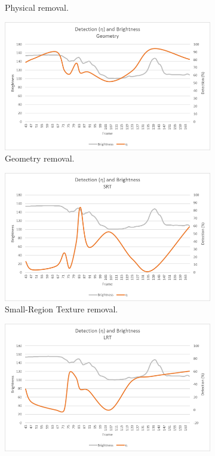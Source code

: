 \begin{figure}
\begin{subfigure}{.32\linewidth}
  \caption{Physical removal.}
\end{subfigure}
\hfill
\begin{subfigure}{.32\linewidth}
  \includegraphics[width=1\linewidth]{figures/selectinganalgorithm_geometry.jpg}
  \caption{Geometry removal.}
\end{subfigure}
\hfill
\begin{subfigure}{.32\linewidth}
  \includegraphics[width=1\linewidth]{figures/selectinganalgorithm_srt.jpg}
  \caption{Small-Region Texture removal.}
\end{subfigure}
\begin{subfigure}{.32\linewidth}
  \includegraphics[width=1\linewidth]{figures/selectinganalgorithm_lrt.jpg}

\end{subfigure}
\end{figure}
